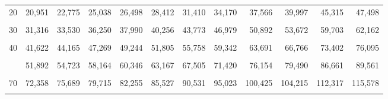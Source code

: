 \documentclass[
  ngerman,
]{article}
\begin{document}
\begin{table}[!h]
{\begin{tabular}{>{}r|rrrrrrrrrrr}
20 & 20,951 & 22,775 & 25,038 & 26,498 & 28,412 & 31,410 & 34,170 & 37,566 & 39,997 & 45,315 & 47,498\\
\addlinespace
\cellcolor{gray!6}{25} & \cellcolor{gray!6}{26,143} & \cellcolor{gray!6}{28,172} & \cellcolor{gray!6}{30,675} & \cellcolor{gray!6}{32,282} & \cellcolor{gray!6}{34,382} & \cellcolor{gray!6}{37,652} & \cellcolor{gray!6}{40,646} & \cellcolor{gray!6}{44,314} & \cellcolor{gray!6}{46,928} & \cellcolor{gray!6}{52,620} & \cellcolor{gray!6}{54,947}\\
30 & 31,316 & 33,530 & 36,250 & 37,990 & 40,256 & 43,773 & 46,979 & 50,892 & 53,672 & 59,703 & 62,162\\
\cellcolor{gray!6}{35} & \cellcolor{gray!6}{36,475} & \cellcolor{gray!6}{38,859} & \cellcolor{gray!6}{41,778} & \cellcolor{gray!6}{43,640} & \cellcolor{gray!6}{46,059} & \cellcolor{gray!6}{49,802} & \cellcolor{gray!6}{53,203} & \cellcolor{gray!6}{57,342} & \cellcolor{gray!6}{60,275} & \cellcolor{gray!6}{66,619} & \cellcolor{gray!6}{69,199}\\
40 & 41,622 & 44,165 & 47,269 & 49,244 & 51,805 & 55,758 & 59,342 & 63,691 & 66,766 & 73,402 & 76,095\\
\cellcolor{gray!6}{45} & \cellcolor{gray!6}{46,761} & \cellcolor{gray!6}{49,452} & \cellcolor{gray!6}{52,729} & \cellcolor{gray!6}{54,810} & \cellcolor{gray!6}{57,505} & \cellcolor{gray!6}{61,656} & \cellcolor{gray!6}{65,410} & \cellcolor{gray!6}{69,957} & \cellcolor{gray!6}{73,166} & \cellcolor{gray!6}{80,077} & \cellcolor{gray!6}{82,876}\\
\addlinespace
50 & 51,892 & 54,723 & 58,164 & 60,346 & 63,167 & 67,505 & 71,420 & 76,154 & 79,490 & 86,661 & 89,561\\
\cellcolor{gray!6}{60} & \cellcolor{gray!6}{62,135} & \cellcolor{gray!6}{65,227} & \cellcolor{gray!6}{68,972} & \cellcolor{gray!6}{71,341} & \cellcolor{gray!6}{74,397} & \cellcolor{gray!6}{79,082} & \cellcolor{gray!6}{83,298} & \cellcolor{gray!6}{88,379} & \cellcolor{gray!6}{91,952} & \cellcolor{gray!6}{99,607} & \cellcolor{gray!6}{102,695}\\
70 & 72,358 & 75,689 & 79,715 & 82,255 & 85,527 & 90,531 & 95,023 & 100,425 & 104,215 & 112,317 & 115,578\\
\cellcolor{gray!6}{80} & \cellcolor{gray!6}{82,566} & \cellcolor{gray!6}{86,120} & \cellcolor{gray!6}{90,405} & \cellcolor{gray!6}{93,106} & \cellcolor{gray!6}{96,578} & \cellcolor{gray!6}{101,879} & \cellcolor{gray!6}{106,629} & \cellcolor{gray!6}{112,329} & \cellcolor{gray!6}{116,321} & \cellcolor{gray!6}{124,839} & \cellcolor{gray!6}{128,261}\\

\end{tabular}}
\end{table}
\end{document}
